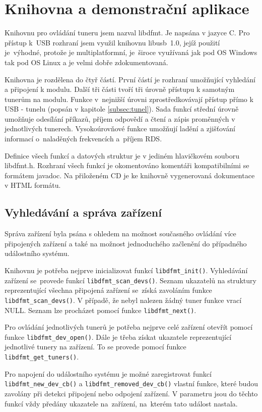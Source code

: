 \section{Knihovna a demonstrační aplikace}
\label{sec:knihovna}

Knihovnu pro ovládání tuneru jsem nazval libdfmt. Je napsána v jazyce C. Pro přístup k~USB rozhraní jsem využil knihovnu libusb~1.0, jejíž použití je~výhodné, protože je multiplatformní, je~široce využívaná jak pod OS Windows tak pod OS Linux a je velmi dobře zdokumentovaná.

Knihovna je rozdělena do čtyř částí. První částí je rozhraní umožňující vyhledání a připojení k modulu. Další tři části tvoří  tři úrovně přístupu k samotným tunerům na modulu. Funkce v~nejnižší úrovni zprostředkovávají přístup přímo k USB - \iic tunelu (popsán v kapitole \ref{subsec:tunel}). Sada funkcí střední úrovně umožňuje odesílání příkazů, příjem odpovědí a čtení a zápis proměnných v jednotlivých tunerech. Vysokoúrovňové funkce umožňují ladění a zjišťování informací o~naladěných frekvencích a~příjem RDS.

Definice všech funkcí a datových struktur je v jediném hlavičkovém souboru libdfmt.h. Rozhraní všech funkcí je okomentováno komentáři kompatibilními se formátem javadoc. Na přiloženém CD je ke knihovně vygenerovaná dokumentace v HTML formátu.

\subsection{Vyhledávání a správa zařízení}

Správa zařízení byla psána s ohledem na možnost současného ovládání více připojených zařízení a také na možnost jednoduchého začlenění do případného událostního systému.

Knihovnu je potřeba nejprve inicializovat funkcí \verb|libdfmt_init()|. Vyhledávání zařízení se~provede funkcí \verb|libdfmt_scan_devs()|. Seznam ukazatelů na struktury reprezentující všechna připojená zařízení se~získá zavoláním funkce \verb|libdfmt_scan_devs()|. V případě, že nebyl nalezen žádný tuner funkce vrací NULL. Seznam lze procházet pomocí funkce \verb|libdfmt_next()|. 

Pro ovládání jednotlivých tunerů je potřeba nejprve celé zařízení otevřít pomocí funkce \verb|libdfmt_dev_open()|. Dále je třeba získat ukazatele reprezentující jednotlivé tunery na zařízení. To se provede pomocí funkce \verb|libdfmt_get_tuners()|.

Pro napojení do událostního systému je možné zaregistrovat funkcí \verb|libdfmt_new_dev_cb()| a \verb|libdfmt_removed_dev_cb()| vlastní funkce, které budou zavolány při detekci připojení nebo odpojení zařízení. V parametru jsou do těchto funkcí vždy předány ukazatele na~zařízení, na~kterém tato událost nastala.

